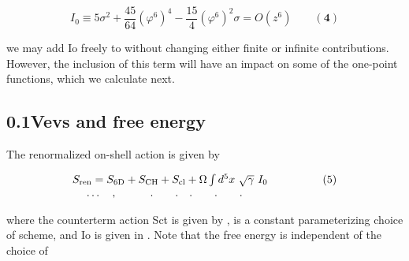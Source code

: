 \documentclass{article}
\begin{document}
\begin{equation}
I _ { 0 } \equiv 5 \sigma ^ { 2 } + \frac { 4 5 } { 6 4 } ( \varphi ^ { 6 } ) ^ { 4 } - \frac { 1 5 } { 4 } ( \varphi ^ { 6 } ) ^ { 2 } \sigma = O ( z ^ { 6 } ) \qquad ( \mathbf { 4 } )
\end{equation}


we may add Io freely to without changing either finite or infinite contributions. However,
the inclusion of this term will have an impact on some of the one-point functions, which we
calculate next.


\subsection*{0.1Vevs and free energy}


The renormalized on-shell action is given by


\begin{equation}
\begin{array} { c c c } { S _ { \mathrm { r e n } } = S _ { \mathrm { 6 D } } + S _ { \mathrm { C H } } + S _ { \mathrm { c l } } + \Omega \int d ^ { 5 } x ~ \sqrt { \gamma } ~ I _ { 0 } } & { \qquad \qquad ( 5 ) } \\ { \dots \quad, \quad \quad \quad. \quad \quad. \quad. \quad \quad. \quad \quad. \quad } \end{array}
\end{equation}


where the counterterm action Sct is given by ,  is a constant parameterizing choice of
scheme, and Io is given in . Note that the free energy is independent of the choice of
\end{document}
